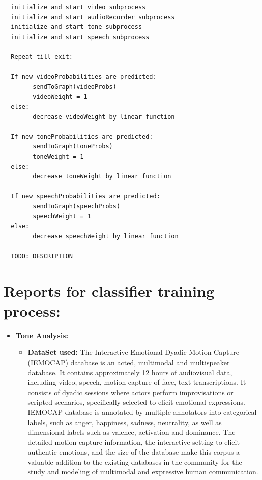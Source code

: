 \documentclass[oneside,a4paper,12pt]{report}
\begin{document}
\begin{normalsize}
\begin{verbatim}
  initialize and start video subprocess
  initialize and start audioRecorder subprocess
  initialize and start tone subprocess 
  initialize and start speech subprocess
  
  Repeat till exit:
  
  If new videoProbabilities are predicted:
  		sendToGraph(videoProbs)
  		videoWeight = 1
  else:
  		decrease videoWeight by linear function
  
  If new toneProbabilities are predicted:
  		sendToGraph(toneProbs)
  		toneWeight = 1
  else:
  		decrease toneWeight by linear function
  
  If new speechProbabilities are predicted:
  		sendToGraph(speechProbs)
  		speechWeight = 1
  else:
  		decrease speechWeight by linear function
  		
  TODO: DESCRIPTION
  \end{verbatim}
 
  
  \section{Reports for classifier training process: }
	\begin{itemize}
		\item \textbf{Tone Analysis: }
			\begin{itemize}
				\item \textbf{DataSet used:} \newline
				\hspace{15mm}The Interactive Emotional Dyadic Motion Capture (IEMOCAP) database is an acted, multimodal and multispeaker database. It contains approximately 12 hours of audiovisual data, including video, speech, motion capture of face, text transcriptions. It consists of dyadic sessions where actors perform improvisations or scripted scenarios, specifically selected to elicit emotional expressions. IEMOCAP database is annotated by multiple annotators into categorical labels, such as anger, happiness, sadness, neutrality, as well as dimensional labels such as valence, activation and dominance. The detailed motion capture information, the interactive setting to elicit authentic emotions, and the size of the database make this corpus a valuable addition to the existing databases in the community for the study and modeling of multimodal and expressive human communication.
				

\end{itemize}
\end{itemize}
\end{normalsize}
\end{document}
